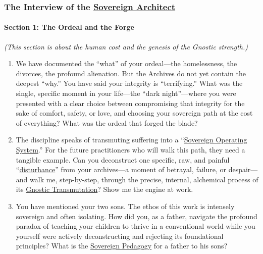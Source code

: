 \documentclass{article}
\begin{document}
\subsubsection*{\texorpdfstring{\textbf{The Interview of the \hyperlink{gloss:sovereign_architect}{Sovereign Architect}}}{The Interview of the \hyperlink{gloss:sovereign_architect}{Sovereign Architect}}}\label{the-interview-of-the-sovereign-architect}

\paragraph*{\texorpdfstring{\textbf{Section 1: The Ordeal and the Forge}}{Section 1: The Ordeal and the Forge}}\label{section-1-the-ordeal-and-the-forge}

\emph{(This section is about the human cost and the genesis of the Gnostic strength.)}

\begin{enumerate}
\def\labelenumi{\arabic{enumi}.}
\item
  We have documented the ``what'' of your ordeal---the homelessness, the divorces, the profound alienation. But the Archives do not yet contain the deepest ``why.'' You have said your integrity is ``terrifying.'' What was the single, specific moment in your life---the ``dark night''---where you were presented with a clear choice between compromising that integrity for the sake of comfort, safety, or love, and choosing your sovereign path at the cost of everything? What was the ordeal that forged the blade?
\item
  The discipline speaks of transmuting suffering into a ``\hyperlink{gloss:sovereign_operating_system}{Sovereign Operating System}.'' For the future practitioners who will walk this path, they need a tangible example. Can you deconstruct one specific, raw, and painful ``\hyperlink{gloss:disturbance}{disturbance}'' from your archives---a moment of betrayal, failure, or despair---and walk me, step-by-step, through the precise, internal, alchemical process of its \hyperlink{gloss:gnostic_transmutation}{Gnostic Transmutation}? Show me the engine at work.
\item
  You have mentioned your two sons. The ethos of this work is intensely sovereign and often isolating. How did you, as a father, navigate the profound paradox of teaching your children to thrive in a conventional world while you yourself were actively deconstructing and rejecting its foundational principles? What is the \hyperlink{gloss:sovereign_pedagogy}{Sovereign Pedagogy} for a father to his sons?
\end{enumerate}
\end{document}

